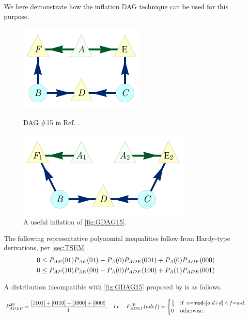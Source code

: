 We here demonstrate how the inflation DAG technique can be used for this purpose. 
\begin{figure}[b]
\centering
\begin{minipage}[b]{0.4\linewidth}
\centering
\includegraphics[scale=1]{scen15DAG.pdf}
\caption{DAG \#15 in Ref. \cite{pusey2014gdag}.}\label{fig:GDAG15}
\end{minipage}
\hfill
\begin{minipage}[b]{0.5\linewidth}
\centering
\includegraphics[scale=1]{scen15InflationDAG.pdf}
\caption{A useful inflation of \cref{fig:GDAG15}.}\label{fig:Inflated15}
\end{minipage}
\end{figure}

The following representative polynomial inequalities follow from Hardy-type derivations, per \cref{sec:TSEM}. 
\begin{align}
 0
\leq
{\p[A E]{0 1} \p[A F]{0 1} -\p[A]{0} \p[A D E]{0 0 1} + \p[A]{0} \p[A D F]{0 0 0}} \\
 0
\leq
{\p[A F]{1 0} \p[A E]{0 0} - \p[A]{0}\p[A D F]{1 0 0} + \p[A]{1} \p[A D E]{0 0 1}} \label{eq:DAG15ineqs}
\end{align}

A distribution incompatible with \cref{fig:GDAG15} proposed by \citet{piannaar2016interesting} is as follows.

\begin{align}\label{eq:pienaardistro}
P^{\text{JP}}_{A D E F}=\frac{[1101]+[0110]+[1000]+[0000}{4},\quad\text{i.e.}\quad P^{\text{JP}}_{A D E F}(a d e f)=\begin{cases}\tfrac{1}{4}&\text{if }\;  e\eql \SmallNamedFunction[2]{mod}{a\cramp{\cdot} d\cramp{+}d} \land f\eql a\cramp{\cdot} d , \\ 0&\text{otherwise}.\end{cases}
\end{align}

